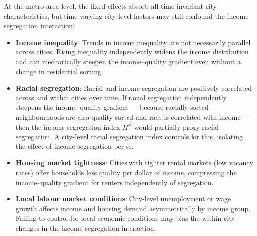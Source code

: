 At the metro-area level, the fixed effects absorb all time-invariant city characteristics, but time-varying city-level factors may still confound the income segregation interaction:

\begin{itemize}
  \item \textbf{Income inequality}: Trends in income inequality are not necessarily parallel across cities. Rising inequality independently widens the income distribution and can mechanically steepen the income--quality gradient even without a change in residential sorting.
  \item \textbf{Racial segregation}: Racial and income segregation are positively correlated across and within cities over time. If racial segregation independently steepens the income--quality gradient --- because racially sorted neighbourhoods are also quality-sorted and race is correlated with income --- then the income segregation index $H^R$ would partially proxy racial segregation. A city-level racial segregation index controls for this, isolating the effect of income segregation per se.
  \item \textbf{Housing market tightness}: Cities with tighter rental markets (low vacancy rates) offer households less quality per dollar of income, compressing the income--quality gradient for renters independently of segregation.
  \item \textbf{Local labour market conditions}: City-level unemployment or wage growth affects income and housing demand asymmetrically by income group. Failing to control for local economic conditions may bias the within-city changes in the income segregation interaction.
\end{itemize}